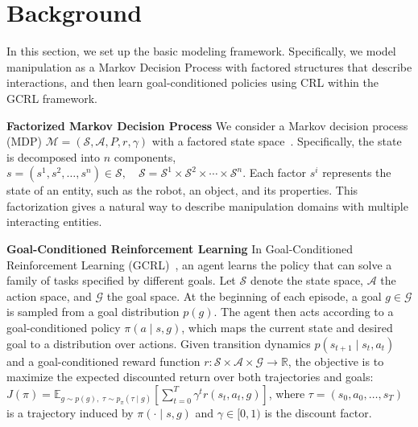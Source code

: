 \section{Background}
In this section, we set up the basic modeling framework. Specifically, we model manipulation as a Markov Decision Process with factored structures that describe interactions, and then learn goal-conditioned policies using CRL within the GCRL framework.

\textbf{Factorized Markov Decision Process} We consider a Markov decision process (MDP) $\mathcal{M}=(\mathcal{S},\mathcal{A},P,r,\gamma)$ with a factored state space~\citep{guestrin2003efficient}. Specifically, the state is decomposed into $n$ components, $s = (s^{1}, s^{2}, \ldots, s^{n}) \in \mathcal{S},
    \quad 
    \mathcal{S} = \mathcal{S}^{1} \times \mathcal{S}^{2} \times \cdots \times \mathcal{S}^{n}$.
Each factor $s^{i}$ represents the state of an entity, such as the robot, an object, and its properties. This factorization gives a natural way to describe manipulation domains with multiple interacting entities.

\textbf{Goal-Conditioned Reinforcement Learning}
In Goal-Conditioned Reinforcement Learning (GCRL)~\citep{kaelbling1993learning}, an agent learns the policy that can solve a family of tasks specified by different goals. Let $\mathcal{S}$ denote the state space, $\mathcal{A}$ the action space, and $\mathcal{G}$ the goal space. At the beginning of each episode, a goal $g \in \mathcal{G}$ is sampled from a goal distribution $p(g)$. The agent then acts according to a goal-conditioned policy $\pi(a \mid s, g)$, which maps the current state and desired goal to a distribution over actions. 
Given transition dynamics $p(s_{t+1}\mid s_t,a_t)$ and a goal-conditioned reward function $r:\mathcal{S}\times\mathcal{A}\times\mathcal{G}\rightarrow \mathbb{R}$, the objective is to maximize the expected discounted return over both trajectories and goals: $J(\pi)
    =
    \mathbb{E}_{g \sim p(g),\; \tau \sim p_\pi(\tau \mid g)}
    \left[
    \sum_{t=0}^{T} \gamma^t r(s_t,a_t,g)
    \right]$,
where $\tau=(s_0,a_0,\ldots,s_T)$ is a trajectory induced by $\pi(\cdot\mid s,g)$ and $\gamma \in [0,1)$ is the discount factor. 

